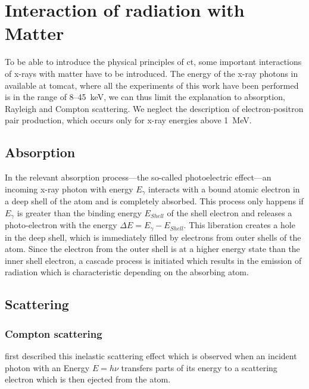 \section{Interaction of radiation with Matter}
To be able to introduce the physical principles of \ac{ct}, some important interactions of x-rays with matter have to be introduced. The energy of the x-ray photons in available at \ac{tomcat}, where all the experiments of this work have been performed is in the range of 8--\SI{45}{\kilo\electronvolt}, we can thus limit the explanation to absorption, Rayleigh and Compton scattering. We neglect the description of electron-positron pair production, which occurs only for x-ray energies above \SI{1}{\mega\electronvolt}.

\subsection{Absorption}\label{sec:absorption}
In the relevant absorption process---the so-called photoelectric effect---an incoming x-ray photon with energy $E_{\gamma}$ interacts with a bound atomic electron in a deep shell of the atom and is completely absorbed. This process only happens if $E_{\gamma}$ is greater than the binding energy $E_{Shell}$ of the shell electron and releases a photo-electron with the energy $\Delta E=E_{\gamma}-E_{Shell}$. This liberation creates a hole in the deep shell, which is immediately filled by electrons from outer shells of the atom. Since the electron from the outer shell is at a higher energy state than the inner shell electron, a cascade process is initiated which results in the emission of radiation which is characteristic depending on the absorbing atom.

\subsection{Scattering}
\subsubsection{Compton scattering}
\citet{Compton1923} first described this inelastic scattering effect which is observed when an incident photon with an Energy $E=h\nu$ transfers parts of its energy to a scattering electron which is then ejected from the atom. 

